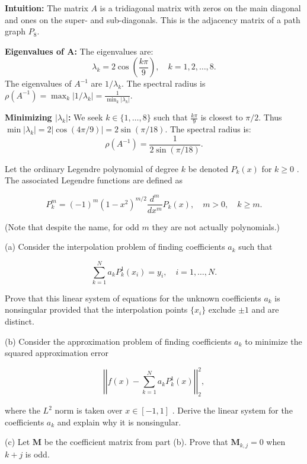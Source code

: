 \begin{solution}
\textbf{Intuition:} The matrix $A$ is a tridiagonal matrix with zeros on the main diagonal and ones on the super- and sub-diagonals. This is the adjacency matrix of a path graph $P_8$.

\textbf{Eigenvalues of A:} 
The eigenvalues are:
\[
\lambda_k = 2 \cos\left(\frac{k\pi}{9}\right), \quad k=1, 2, \dots, 8.
\]
The eigenvalues of $A^{-1}$ are $1/\lambda_k$. The spectral radius is $\rho(A^{-1}) = \max_k |1/\lambda_k| = \frac{1}{\min_k |\lambda_k|}$.

\textbf{Minimizing $|\lambda_k|$:} We seek $k \in \{1, \dots, 8\}$ such that $\frac{k\pi}{9}$ is closest to $\pi/2$. 
Thus $\min |\lambda_k| = 2 |\cos(4\pi/9)| = 2 \sin(\pi/18)$.
The spectral radius is:
\[
\rho(A^{-1}) = \frac{1}{2 \sin(\pi/18)}.
\]
\end{solution}

\begin{exercise}
\label{applied:2025:3}
Let the ordinary Legendre polynomial of degree $k$ be denoted $P _ { k } ( x )$ for $k \geq 0$ . The associated Legendre functions are defined as

\[
P _ {k} ^ {m} = (- 1) ^ {m} (1 - x ^ {2}) ^ {m / 2} \frac {d ^ {m}}{d x ^ {m}} P _ {k} (x), \quad m > 0, \quad k \geq m.
\]

(Note that despite the name, for odd $m$ they are not actually polynomials.)

(a) Consider the interpolation problem of finding coefficients $a _ { k }$ such that

\[
\sum_ {k = 1} ^ {N} a _ {k} P _ {k} ^ {1} (x _ {i}) = y _ {i}, \quad i = 1, \dots , N.
\]

Prove that this linear system of equations for the unknown coefficients $a _ { k }$ is nonsingular provided that the interpolation points $\{ x _ { i } \}$ exclude $\pm 1$ and are distinct.

(b) Consider the approximation problem of finding coefficients $a _ { k }$ to minimize the squared approximation error

\[
\left| \left| f (x) - \sum_ {k = 1} ^ {N} a _ {k} P _ {k} ^ {1} (x) \right| \right| _ {2} ^ {2},
\]

where the $L ^ { 2 }$ norm is taken over $x \in [ - 1 , 1 ]$ . Derive the linear system for the coefficients $a _ { k }$ and explain why it is nonsingular.

(c) Let $\mathbf { M }$ be the coefficient matrix from part (b). Prove that $\mathbf { M } _ { k , j } = 0$ when $k + j$ is odd.
\end{exercise}

